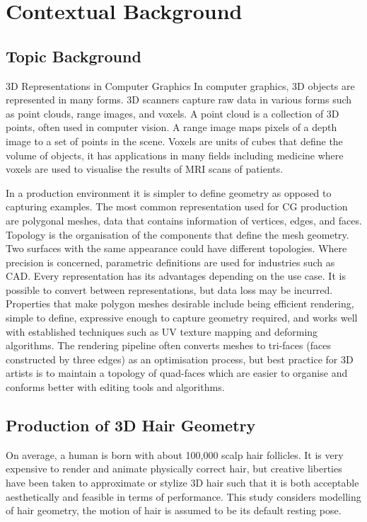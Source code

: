\documentclass[ %
                    author={Dillon Keith Diep},
                supervisor={Dr. Carl Henrik Ek},
                    degree={MEng},
                     title={Assisted Content Generation for 3D Hair Geometry},
                  subtitle={[INCOMPLETE DRAFT, NOT FOR SUBMISSION]},
                      type={Research},
                      year={2014} ]{dissertation}
\begin{document}
\mainmatter


\chapter{Contextual Background}
\label{chap:context}

\section{Topic Background}
\noindent
3D Representations in Computer Graphics
In computer graphics, 3D objects are represented in many forms. 3D scanners capture raw data in various forms such as point clouds, range images, and voxels. A point cloud is a collection of 3D points, often used in computer vision.  A range image maps pixels of a depth image to a set of points in the scene. Voxels are units of cubes that define the volume of objects, it has applications in many fields including medicine where voxels are used to visualise the results of MRI scans of patients.\cite{mri}

In a production environment it is simpler to define geometry as opposed to capturing examples. The most common representation used for CG production are polygonal meshes, data that contains information of vertices, edges, and faces. Topology is the organisation of the components that define the mesh geometry. Two surfaces with the same appearance could have different topologies. Where precision is concerned, parametric definitions are used for industries such as CAD. Every representation has its advantages depending on the use case. It is possible to convert between representations, but data loss may be incurred. Properties that make polygon meshes desirable include being efficient rendering, simple to define, expressive enough to capture geometry required, and works well with established techniques such as UV texture mapping and deforming algorithms. The rendering pipeline often converts meshes to tri-faces (faces constructed by three edges) as an optimisation process, but best practice for 3D artists is to maintain a topology of quad-faces which are easier to organise and conforms better with editing tools and algorithms.


\section{Production of 3D Hair Geometry}
\noindent
On average, a human is born with about 100,000 scalp hair follicles. It is very expensive to render and animate physically correct hair, but creative liberties have been taken to approximate or stylize 3D hair such that it is both acceptable aesthetically and feasible in terms of performance. This study considers modelling of hair geometry, the motion of hair is assumed to be its default resting pose.
\end{document}

